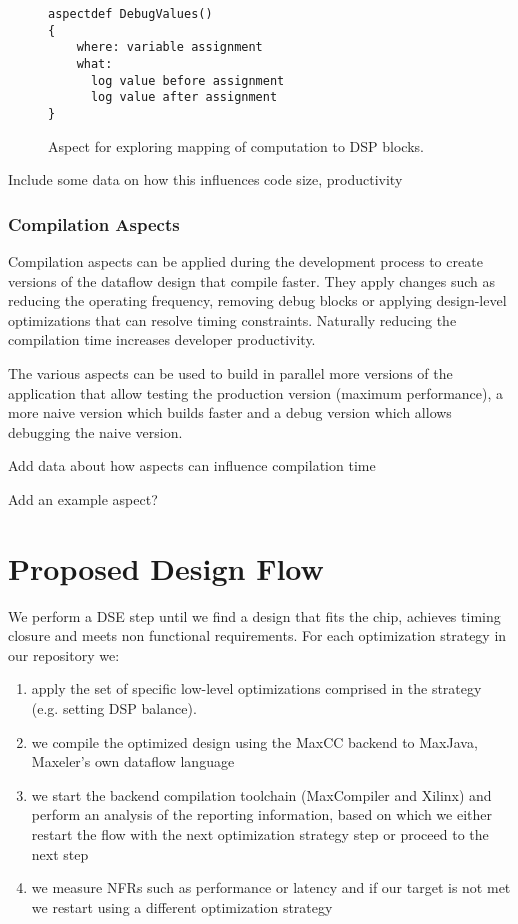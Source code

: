 \lstset{style=aspectp}
\begin{figure}[!h]
\centering
\begin{lstlisting}
aspectdef DebugValues()
{
    where: variable assignment
    what:
      log value before assignment
      log value after assignment
}
\end{lstlisting}
\caption{Aspect for exploring mapping of computation to DSP blocks.}
\label{fig:aspect-DSP}
\end{figure}


\TODO Include some data on how this influences code size,
  productivity

\subsubsection{Compilation Aspects}

Compilation aspects can be applied during the development process to
create versions of the dataflow design that compile faster. They apply
changes such as reducing the operating frequency, removing debug
blocks or applying design-level optimizations that can resolve timing
constraints. Naturally reducing the compilation time increases
developer productivity.

The various aspects can be used to build in parallel more versions of
the application that allow testing the production version (maximum
performance), a more naive version which builds faster and a debug
version which allows debugging the naive version.

\TODO Add data about how aspects can influence compilation time

\TODO Add an example aspect?


\section{Proposed Design Flow}

We perform a DSE step until we find a design that fits the chip,
achieves timing closure and meets non functional requirements.  For
each optimization strategy in our repository we:

\begin{enumerate}

\item apply the set of specific low-level optimizations comprised in
  the strategy (e.g. setting DSP balance).

\item  we compile the optimized
  design using the MaxCC backend to MaxJava, Maxeler's own dataflow
  language

\item we start the backend compilation toolchain (MaxCompiler
  and Xilinx) and perform an analysis of the reporting information,
  based on which we either restart the flow with the next optimization
  strategy step or proceed to the next step

\item we measure NFRs such as performance or latency and if our target
  is not met we restart using a different optimization strategy

\end{enumerate}

